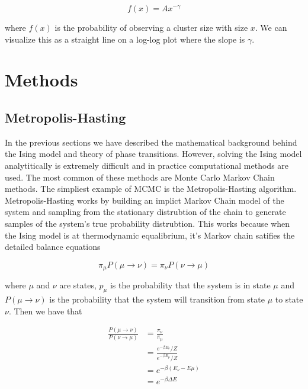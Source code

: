 \documentclass{article}
\begin{document}
\begin{equation}
    f(x) = A x^{-\gamma}
\end{equation}

where $f(x)$ is the probability of observing a cluster size with size $x$. We can visualize this as a straight line
on a log-log plot where the slope is $\gamma$.

\section{Methods}
\label{Methods}

\subsection{Metropolis-Hasting}
In the previous sections we have described the mathematical background behind the Ising model and theory of phase transitions.
However, solving the Ising model analytitically is extremely difficult and in practice computational methods are used. The most common of these methods 
are Monte Carlo Markov Chain methods. The simpliest example of MCMC is the Metropolis-Hasting algorithm. Metropolis-Hasting works by building 
an implict Markov Chain model of the system and sampling from the stationary distrubtion of the chain to generate samples of the system's true probability
distrubtion. This works because when the Ising model is at thermodynamic equalibrium, it's Markov chain satifies the detailed balance equations

\begin{equation}
    \pi_{\mu} P(\mu \rightarrow \nu) = \pi_{\nu} P(\nu \rightarrow \mu)
\end{equation}

where $\mu$ and $\nu$ are states, $p_{\mu}$ is the probability that the system is in state $\mu$ and $P(\mu \rightarrow \nu)$
is the probability that the system will transition from state $\mu$ to state $\nu$. Then we have that 

\begin{align}
    \frac{P(\mu \rightarrow \nu)}{P(\nu \rightarrow \mu)}
    &= \frac{\pi_{\nu}}{\pi_{\mu}} \\
    &= \frac{e^{-\beta E_{\nu}} / Z}{e^{-\beta E_{\mu}} / Z} \\
    &= e^{-\beta(E_{\nu} - E{\mu})} \\
    &= e^{-\beta \Delta E}
\end{align}
\end{document}
